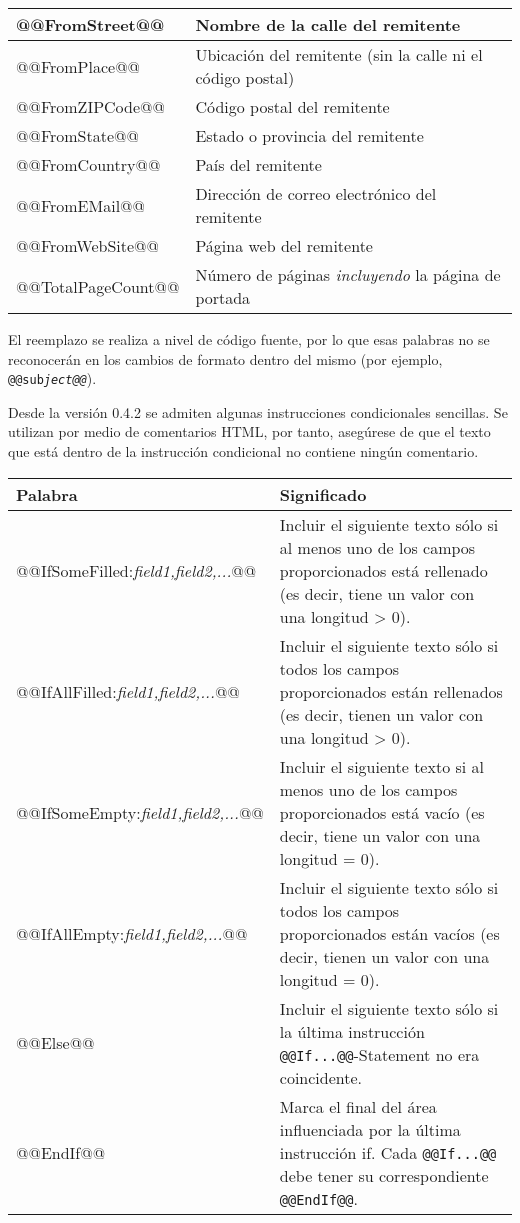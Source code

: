 \documentclass[a4paper,10pt]{scrartcl}
\begin{document}
\begin{center}
\begin{tabular}{|l|p{}|}
\ttfamily @@FromStreet@@ & Nombre de la calle del remitente \\\hline
\ttfamily @@FromPlace@@ & Ubicación del remitente (sin la calle ni el código postal)\\\hline
\ttfamily @@FromZIPCode@@ & Código postal del remitente \\\hline
\ttfamily @@FromState@@ & Estado o provincia del remitente\\\hline
\ttfamily @@FromCountry@@ & País del remitente\\\hline
\ttfamily @@FromEMail@@ & Dirección de correo electrónico del remitente\\\hline
\ttfamily @@FromWebSite@@ & Página web del remitente\\\hline
\ttfamily @@TotalPageCount@@ & Número de páginas \textit{incluyendo} la página de portada \\\hline
\end{tabular}
\end{center}

El reemplazo se realiza a nivel de código fuente, por lo que esas palabras no se reconocerán en los cambios de formato dentro del mismo (por ejemplo, \texttt{@@sub\textit{ject@@}}).

Desde la versión 0.4.2 se admiten algunas instrucciones condicionales sencillas. Se utilizan por medio de comentarios HTML, por tanto, asegúrese de que el texto que está dentro de la instrucción condicional no contiene ningún comentario.
\begin{center}
\begin{tabular}{|l|p{}|}
\hline
\bfseries Palabra & \bfseries Significado \\
\hline\hline
\ttfamily @@IfSomeFilled:\textit{field1,field2,...}@@ & Incluir el siguiente texto sólo si al menos uno de los campos proporcionados está rellenado (es decir, tiene un valor con una longitud > 0).\\\hline
\ttfamily @@IfAllFilled:\textit{field1,field2,...}@@ & Incluir el siguiente texto sólo si todos los campos proporcionados están rellenados (es decir, tienen un valor con una longitud > 0).\\\hline
\ttfamily @@IfSomeEmpty:\textit{field1,field2,...}@@ & Incluir el siguiente texto si al menos uno de los campos proporcionados está vacío (es decir, tiene un valor con una longitud = 0).\\\hline
\ttfamily @@IfAllEmpty:\textit{field1,field2,...}@@ & Incluir el siguiente texto sólo si todos los campos proporcionados están vacíos (es decir, tienen un valor con una longitud = 0).\\\hline
\ttfamily @@Else@@ & Incluir el siguiente texto sólo si la última instrucción \texttt{@@If...@@}-Statement no era coincidente.\\\hline
\ttfamily @@EndIf@@ & Marca el final del área influenciada por la última instrucción if. Cada \texttt{@@If...@@} debe tener su correspondiente \texttt{@@EndIf@@}.\\\hline
\end{tabular}
\end{center}
\end{document}
